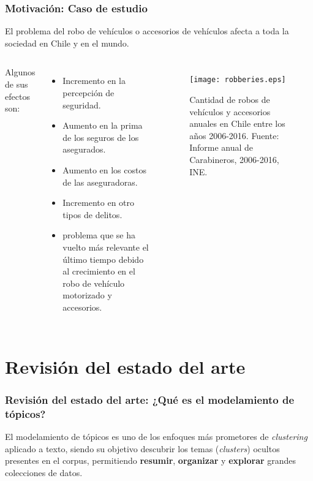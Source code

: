 \documentclass[
	spanish, %
	aspectratio=43, %
	hyperref={pdfencoding=auto,psdextra},
	xcolor={dvipsnames,table,usenames},
]{beamer}
\begin{document}
\begin{frame}[t]
\frametitle{Motivación: Caso de estudio} 

El problema del robo de vehículos o accesorios de vehículos afecta a toda la sociedad en Chile y en el mundo. 
\begin{columns}

Algunos de sus efectos son:
  \begin{itemize}
    \item Incremento en la percepción de seguridad.
    \item Aumento en la prima de los seguros de los asegurados.
    \item Aumento en los costos de las aseguradoras.
    \item Incremento en otro tipos de delitos.
    \item problema que se ha vuelto más relevante el último tiempo debido al crecimiento en el robo de vehículo motorizado y accesorios. 
  \end{itemize}
 
\begin{figure}
    \texttt{[image: robberies.eps]} 
    \caption{Cantidad de robos de vehículos y accesorios anuales en Chile entre los años 2006-2016. Fuente: Informe anual de Carabineros, 2006-2016, INE.} 
    \label{fig:antecedente}
\end{figure}

\end{columns}
\end{frame}




\section{Revisión del estado del arte}

\begin{frame}[t]
\frametitle{Revisión del estado del arte: ¿Qué es el modelamiento de tópicos?}
  El modelamiento de tópicos es uno de los enfoques más prometores de \textit{clustering} aplicado a texto, siendo su objetivo descubrir los temas (\textit{clusters}) ocultos presentes en el corpus, permitiendo \textbf{resumir}, \textbf{organizar} y \textbf{explorar} grandes colecciones de datos.

\begin{figure}
\end{figure}

\end{frame}
\end{document}
